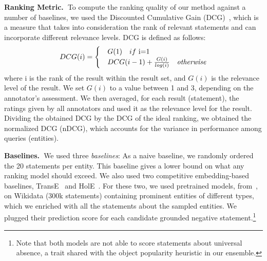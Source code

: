 \begin{table*}
  \caption{Data samples for illustrating parameter tuning.}
  \label{tab:training}
  \end{table*}
\noindent
\textbf{Ranking Metric.\ }To compute the ranking quality of our method against a number of baselines, we used the Discounted Cumulative Gain (DCG)~\cite{NDCG}, which is a measure that takes into consideration the rank of relevant statements and can incorporate different relevance levels. DCG is defined as follows:
\begin{equation*}
DCG(i)=\begin{cases}
& G(1)\ \ \ if\ $i=1$\\
 & DCG(i-1)+\frac{G(i)}{log(i)} \ \ \ \text{\textit{otherwise}}
\end{cases}
\end{equation*}
where i is the rank of the result within the result set, and $G(i)$ is the relevance level of the result. We set $G(i)$ to a value between 1 and 3, depending on the annotator's assessment. We then averaged, for each result (statement), the ratings given by all annotators and used it as the relevance level for the result. Dividing the obtained DCG by the DCG of the ideal ranking, we obtained the normalized DCG (nDCG), which accounts for the variance in performance among queries (entities).

\noindent
\textbf{Baselines.\ }We used three \textit{baselines}: As a naive baseline, we randomly ordered the 20 statements per entity. This baseline gives a lower bound on what any ranking model should exceed. We also used two competitive embedding-based baselines, TransE~\cite{transE} and HolE~\cite{holE}. For these two, we used pretrained models, from~\cite{ho2018rule}, on Wikidata (300k statements) containing prominent entities of different types, which we enriched with all the statements about the sampled entities. We plugged their prediction score for each candidate grounded negative statement.\footnote{Note that both models are not able to score statements about universal absence, a trait shared with the object popularity heuristic in our ensemble.}


